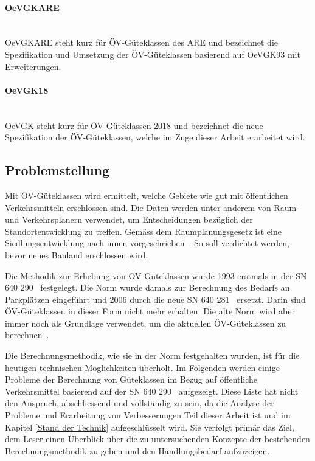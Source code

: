 \paragraph{OeVGKARE}~\\
OeVGKARE steht kurz für \acs{ÖV}-Güteklassen des \acl{ARE} und bezeichnet die Spezifikation und Umsetzung der \acs{ÖV}-Güteklassen basierend auf OeVGK93 mit Erweiterungen.

\paragraph{OeVGK18}~\\
OeVGK steht kurz für \acs{ÖV}-Güteklassen 2018 und bezeichnet die neue Spezifikation der \acs{ÖV}-Güteklassen, welche im Zuge dieser Arbeit erarbeitet wird.

\subsection{Problemstellung}
\label{Einführung:Problemstellung}

Mit \acs{ÖV}-Güteklassen wird ermittelt, welche Gebiete wie gut mit öffentlichen Verkehrsmitteln erschlossen sind.
Die Daten werden unter anderem von Raum- und Verkehrsplanern verwendet, um Entscheidungen bezüglich der Standortentwicklung zu treffen.
Gemäss dem Raumplanungsgesetz ist eine Siedlungsentwicklung nach innen vorgeschrieben~\cite{raumplanungsgesetz}.
So soll verdichtet werden, bevor neues Bauland erschlossen wird.

Die Methodik zur Erhebung von \acs{ÖV}-Güteklassen wurde 1993 erstmals in der \ac{SN} 640 290~\cite{sn640290} festgelegt.
Die Norm wurde damals zur Berechnung des Bedarfs an Parkplätzen eingeführt und 2006 durch die neue \acs{SN} 640 281~\cite{sn640281} ersetzt.
Darin sind \acs{ÖV}-Güteklassen in dieser Form nicht mehr erhalten. Die alte Norm wird aber immer noch als Grundlage verwendet, um die aktuellen \acs{ÖV}-Güteklassen zu berechnen~\cite{berechnung_are}.

Die Berechnungsmethodik, wie sie in der Norm festgehalten wurden, ist für die heutigen technischen Möglichkeiten überholt.
Im Folgenden werden einige Probleme der Berechnung von Güteklassen im Bezug auf öffentliche Verkehrsmittel basierend auf der \ac{SN} 640 290~\cite{sn640290} aufgezeigt.
Diese Liste hat nicht den Anspruch, abschliessend und vollständig zu sein, da die Analyse der Probleme und Erarbeitung von Verbesserungen Teil dieser Arbeit ist und im Kapitel \ref{Stand der Technik} aufgeschlüsselt wird.
Sie verfolgt primär das Ziel, dem Leser einen Überblick über die zu untersuchenden Konzepte der bestehenden Berechnungsmethodik zu geben und den Handlungsbedarf aufzuzeigen.

